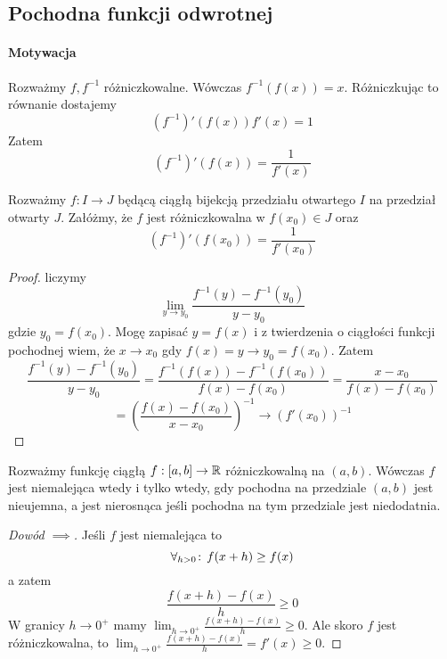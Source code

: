 \documentclass[9pt]{article}
\begin{document}
\subsection{Pochodna funkcji odwrotnej}

\paragraph{Motywacja}
Rozważmy $f, f^{-1}$ różniczkowalne. Wówczas $f^{-1}(f(x)) = x$. Różniczkując to równanie dostajemy
\[
    (f^{-1})'(f(x)) f'(x) = 1
\]
Zatem
\[
    (f^{-1})'(f(x)) = \frac{1}{f'(x)}
\]

\begin{Twi}
    Rozważmy $f: I \to J$ będącą ciągłą bijekcją przedziału otwartego $I$ na przedział otwarty $J$.
    Załóżmy, że $f$ jest różniczkowalna w $f(x_0) \in J$ oraz
    \[
        (f^{-1})'(f(x_0)) = \frac{1}{f'(x_0)}
    \]
\end{Twi}

\begin{proof}
    liczymy
    \[
        \lim_{y \to y_0} \frac{f^{-1}(y) - f^{-1}(y_0)}{y-y_0}
    \]
    gdzie $y_0 = f(x_0)$.
    Mogę zapisać $y = f(x)$ i z twierdzenia o ciągłości funkcji pochodnej wiem, że $x \to x_0$ gdy
    $f(x) = y \to y_0 = f(x_0)$. Zatem
    \[
        \frac{f^{-1}(y) - f^{-1}(y_0)}{y-y_0} =
        \frac{f^{-1}(f(x)) - f^{-1}(f(x_0))}{f(x)-f(x_0)}
        =
        \frac{x-x_0}{f(x)-f(x_0)}
    \]
    \[
        =
        \left(\frac{f(x)-f(x_0)}{x-x_0}\right)^{-1}
        \to (f'(x_0))^{-1}
    \]
\end{proof}

\begin{Twi}
    Rozważmy funkcję ciągłą $f: [a,b] \to \mathbb{R}$ różniczkowalną na $(a,b)$. Wówczas $f$ jest
    niemalejąca wtedy i tylko wtedy, gdy pochodna na przedziale $(a,b)$ jest nieujemna, a jest
    nierosnąca jeśli pochodna na tym przedziale jest niedodatnia.
\end{Twi}

\begin{proof}[Dowód $\implies$]
    Jeśli $f$ jest niemalejąca to
    \[
        \forall_{h > 0} \! : \, f(x+h) \ge f(x)
    \]
    a zatem
    \[
        \frac{f(x+h)-f(x)}{h} \ge 0
    \]
    W granicy $h \to 0^+$ mamy $\lim_{h \to 0^+} \frac{f(x+h)-f(x)}{h} \ge 0$. Ale skoro $f$ jest
    różniczkowalna, to $\lim_{h \to 0^+} \frac{f(x+h)-f(x)}{h} = f'(x) \ge 0$.
\end{proof}
\end{document}
